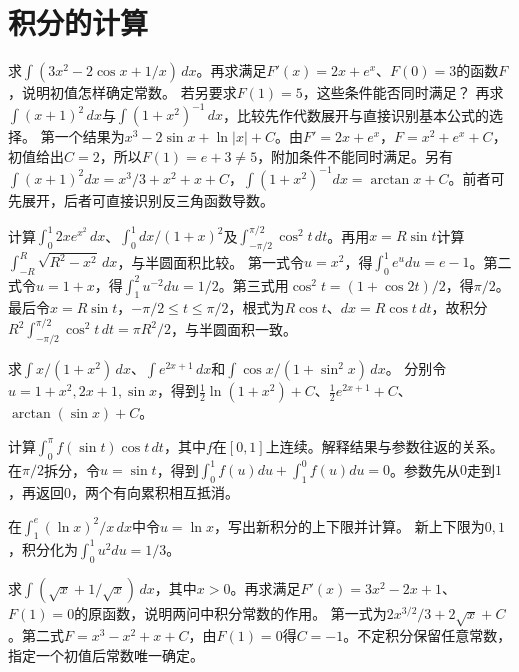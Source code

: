 \par\addvspace{12pt}

\section{积分的计算}

求\(\int(3x^2-2\cos x+1/x)\,dx\)。再求满足\(F'(x)=2x+e^x\)、\(F(0)=3\)的函数\(F\)，说明初值怎样确定常数。
若另要求\(F(1)=5\)，这些条件能否同时满足？
再求\(\int(x+1)^2\,dx\)与\(\int(1+x^2)^{-1}\,dx\)，比较先作代数展开与直接识别基本公式的选择。
\solutionanswer
第一个结果为\(x^3-2\sin x+\ln|x|+C\)。由\(F'=2x+e^x\)，\(F=x^2+e^x+C\)，初值给出\(C=2\)，所以\(F(1)=e+3\ne5\)，附加条件不能同时满足。另有\(\int(x+1)^2dx=x^3/3+x^2+x+C\)，\(\int(1+x^2)^{-1}dx=\arctan x+C\)。前者可先展开，后者可直接识别反三角函数导数。


计算\(\int_0^1 2x e^{x^2}\,dx\)、\(\int_0^1 dx/(1+x)^2\)及\(\int_{-\pi/2}^{\pi/2}\cos^2t\,dt\)。再用\(x=R\sin t\)计算\(\int_{-R}^R\sqrt{R^2-x^2}\,dx\)，与半圆面积比较。
\solutionanswer
第一式令\(u=x^2\)，得\(\int_0^1e^u du=e-1\)。第二式令\(u=1+x\)，得\(\int_1^2u^{-2}du=1/2\)。第三式用\(\cos^2t=(1+\cos2t)/2\)，得\(\pi/2\)。最后令\(x=R\sin t\)，\(-\pi/2\le t\le\pi/2\)，根式为\(R\cos t\)、\(dx=R\cos t\,dt\)，故积分\(R^2\int_{-\pi/2}^{\pi/2}\cos^2t\,dt=\pi R^2/2\)，与半圆面积一致。


求\(\int x/(1+x^2)\,dx\)、\(\int e^{2x+1}\,dx\)和\(\int\cos x/(1+\sin^2x)\,dx\)。
\solutionanswer
分别令\(u=1+x^2,2x+1,\sin x\)，得到\(\frac12\ln(1+x^2)+C\)、\(\frac12e^{2x+1}+C\)、\(\arctan(\sin x)+C\)。


计算\(\int_0^\pi f(\sin t)\cos t\,dt\)，其中\(f\)在\([0,1]\)上连续。解释结果与参数往返的关系。
\solutionanswer
在\(\pi/2\)拆分，令\(u=\sin t\)，得到\(\int_0^1f(u)du+\int_1^0f(u)du=0\)。参数先从\(0\)走到\(1\)，再返回\(0\)，两个有向累积相互抵消。


在\(\int_1^e(\ln x)^2/x\,dx\)中令\(u=\ln x\)，写出新积分的上下限并计算。
\solutionanswer
新上下限为\(0,1\)，积分化为\(\int_0^1u^2du=1/3\)。


求\(\int(\sqrt{x}+1/\sqrt{x})\,dx\)，其中\(x>0\)。再求满足\(F'(x)=3x^2-2x+1\)、\(F(1)=0\)的原函数，说明两问中积分常数的作用。
\solutionanswer
第一式为\(2x^{3/2}/3+2\sqrt x+C\)。第二式\(F=x^3-x^2+x+C\)，由\(F(1)=0\)得\(C=-1\)。不定积分保留任意常数，指定一个初值后常数唯一确定。


